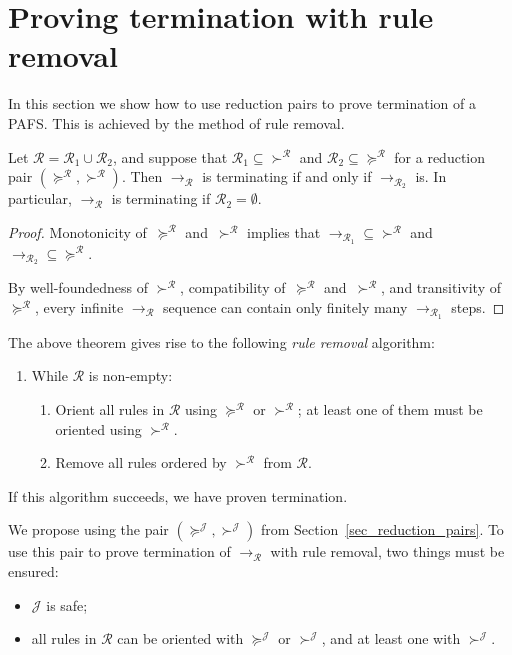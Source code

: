 \documentclass[a4paper,UKenglish,cleveref,autoref,numberwithinsect]{lipics-v2019}
\theoremstyle{definition}
\newcommand{\Rules}{\mathcal{R}}
\newcommand{\arr}[1]{\longrightarrow_{#1}}
\newcommand{\Termmap}{\mathcal{J}}
\newcommand{\succinterpret}{\succ^{\Termmap}}
\newcommand{\succeqinterpret}{\succeq^{\Termmap}}
\begin{document}
\section{Proving termination with rule removal}\label{sec_rule_removal}

In this section we show how to use reduction pairs to prove
termination of a PAFS. This is achieved by the method of rule removal.

\begin{theorem}\label{thm:ruleremove}
  Let $\Rules = \Rules_1 \cup \Rules_2$, and suppose that
  $\Rules_1\subseteq{\succ^\Rules}$ and
  $\Rules_2\subseteq{\succeq^\Rules}$ for a reduction pair
  $(\succeq^\Rules,\succ^\Rules)$. Then $\arr{\Rules}$ is terminating
  if and only if $\arr{\Rules_2}$ is. In particular, $\arr{\Rules}$ is
  terminating if $\Rules_2 = \emptyset$.
\end{theorem}

\begin{proof}
  Monotonicity of~$\succeq^\Rules$ and~$\succ^\Rules$ implies that
  ${\arr{\Rules_1}}\subseteq{\succ^\Rules}$ and
  ${\arr{\Rules_2}}\subseteq{\succeq^\Rules}$.

  By well-foundedness of $\succ^\Rules$, compatibility
  of~$\succeq^\Rules$ and~$\succ^\Rules$, and transitivity
  of~$\succeq^\Rules$, every infinite $\arr{\Rules}$ sequence can
  contain only finitely many $\arr{\Rules_1}$ steps.
\end{proof}

The above theorem gives rise to the following \emph{rule removal}
algorithm:
\begin{enumerate}
\item While $\Rules$ is non-empty:
  \begin{enumerate}
  \item Orient all rules in $\Rules$ using $\succeq^\Rules$ or
    $\succ^\Rules$; at least one of them must be oriented using
    $\succ^\Rules$.
  \item Remove all rules ordered by $\succ^\Rules$ from $\Rules$.
  \end{enumerate}
\end{enumerate}
If this algorithm succeeds, we have proven termination.

We propose using the pair $(\succeqinterpret,\succinterpret)$ from
Section~\ref{sec_reduction_pairs}. To use this pair to prove
termination of $\arr{\Rules}$ with rule removal, two things must be
ensured:
\begin{itemize}
\item $\Termmap$ is safe;
\item all rules in $\Rules$ can be oriented with $\succeqinterpret$ or
  $\succinterpret$, and at least one with $\succinterpret$.
\end{itemize}
\end{document}
